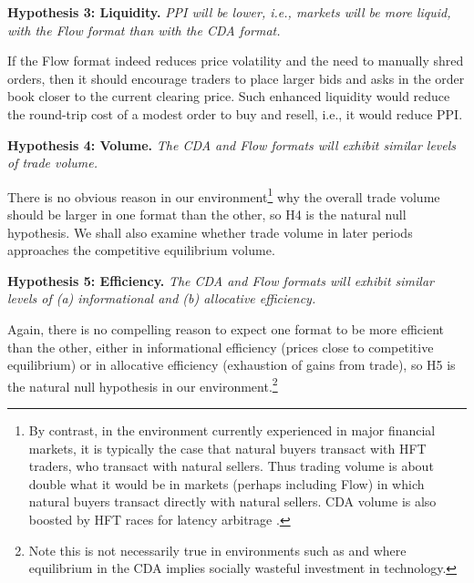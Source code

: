 \documentclass[12pt]{article}
\begin{document}
\vspace{0.3cm}
\noindent \textbf{Hypothesis 3: Liquidity.} \textit{ PPI will be lower, i.e., markets will be more liquid, with the Flow format than with the CDA format.}

\noindent 
If the Flow format indeed reduces price volatility and the need to manually shred orders, then it should encourage traders to place larger bids and asks in the order book closer to the current clearing price. Such enhanced liquidity would reduce the round-trip cost of a modest order to buy and resell, i.e., it would reduce PPI. 

\vspace{0.3cm}
\noindent \textbf{Hypothesis 4: Volume.} \textit{The CDA and Flow formats will exhibit similar levels of trade volume. }

\noindent There is no obvious reason in our environment\footnote{
{By contrast}, in the environment currently experienced in major financial markets, it is typically the case that natural buyers transact with HFT traders, who transact with natural sellers. Thus trading volume is about double what it would be in markets 
(perhaps including Flow) in which natural buyers transact directly with natural sellers.
CDA volume is also boosted by HFT races for latency arbitrage \citep{AquilinaBudishOneill2022}.}
why the overall trade volume should be larger in one format than the other, so H4 is the natural null hypothesis. We shall also examine whether trade volume in later periods approaches the competitive equilibrium volume. 

\vspace{0.3cm}
\noindent \textbf{Hypothesis 5: Efficiency.} \textit{The CDA and Flow formats will exhibit similar levels of (a) informational and (b) allocative efficiency.} 

\noindent Again, there is no compelling reason to expect one format to be more efficient than the other, either in informational efficiency (prices close to competitive equilibrium) or in allocative efficiency (exhaustion of gains from trade), 
so H5 is the natural null hypothesis in our environment.\footnote{
Note this is not necessarily true in environments such as \cite{Budish2015} and \cite{Aldrich2019} where equilibrium in the CDA implies socially wasteful investment in technology.}
\end{document}
